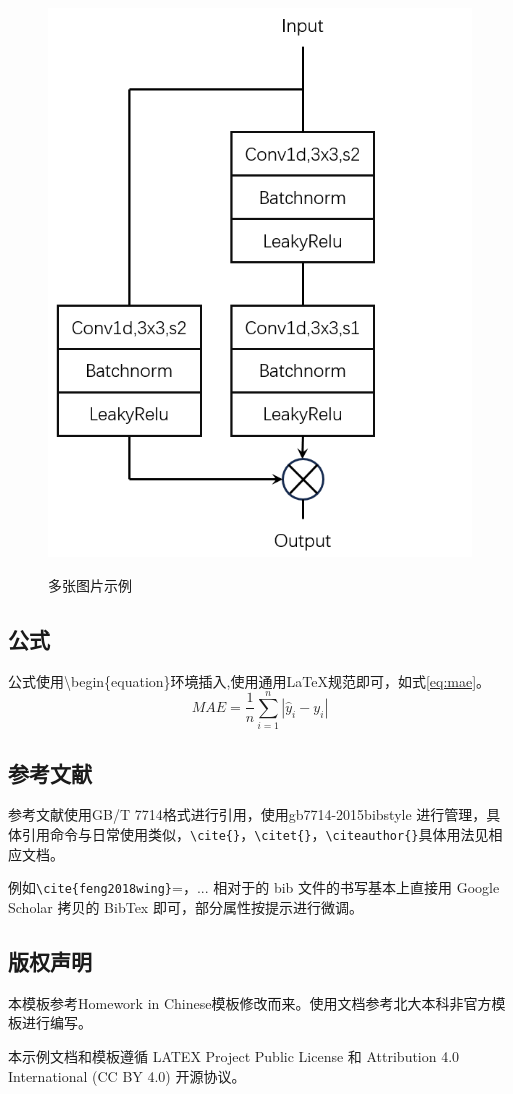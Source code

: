 \begin{thesischapter}
\begin{figure}[h]
{            \includegraphics[width=0.52\linewidth]{Figure/resnet1d_flow_b.png}
            \label{fig:resnet1d_flow.b}
        }
        \caption{多张图片示例}
    \end{figure}
    \subsection{公式}
    公式使用\textbackslash begin\{equation\}环境插入,使用通用\LaTeX{}规范即可，如式\ref{eq:mae}。
    \begin{equation}
        MAE = \frac{1}{n} \sum_{i=1}^n |\hat{y}_i - y_i |
        \label{eq:mae}
    \end{equation}\par
    
    \subsection{参考文献}
    参考文献使用GB/T 7714格式进行引用，使用gb7714-2015bibstyle 进行管理，具体引用命令与日常使用类似，\verb|\cite{}|，\verb|\citet{}|，\verb|\citeauthor{}|具体用法见相应文档\cite{hushidong_biblatex-gb7714-2015}。\par
    例如\verb|\cite{feng2018wing}|=\cite{feng2018wing}，... 相对于的 bib 文件的书写基本上直接用 Google Scholar 拷贝的 BibTex 即可，部分属性按提示进行微调。\par

    \subsection{版权声明}
    本模板参考Homework in Chinese\cite{overleaf2024homework}模板修改而来。使用文档参考北大本科非官方模板\cite{pku_undergrad_thesis_template}进行编写。\par
    本示例文档和模板遵循 LATEX Project Public License 和 Attribution 4.0 International (CC BY 4.0) 开源协议。
\end{thesischapter}